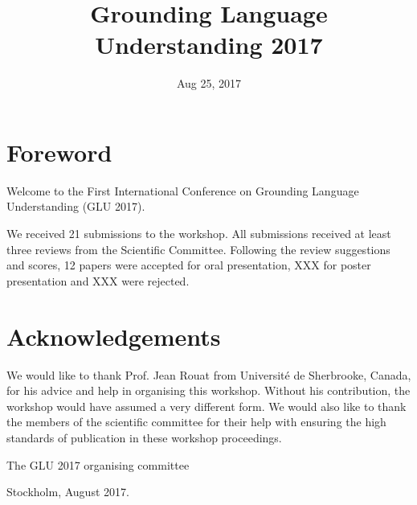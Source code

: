 \documentclass{confproc}
\title{Grounding Language Understanding 2017}
\date{Aug 25, 2017}
\begin{document}
\maketitle
\newpage
\section*{Foreword}
Welcome to the First International Conference on Grounding Language Understanding (GLU 2017).

We received 21 submissions to the workshop. All submissions received at least three reviews from the Scientific Committee. Following the review suggestions and scores, 12 papers were accepted for oral presentation, XXX for poster presentation and XXX were rejected.

\section*{Acknowledgements}
We would like to thank Prof. Jean Rouat from Université de Sherbrooke, Canada, for his advice and help in organising this workshop. Without his contribution, the workshop would have assumed a very different form. We would also like to thank the members of the scientific committee for their help with ensuring the high standards of publication in these workshop proceedings.

\vspace{1cm}
\noindent The GLU 2017 organising committee

\noindent Stockholm, August 2017.

\newpage
\end{document}
